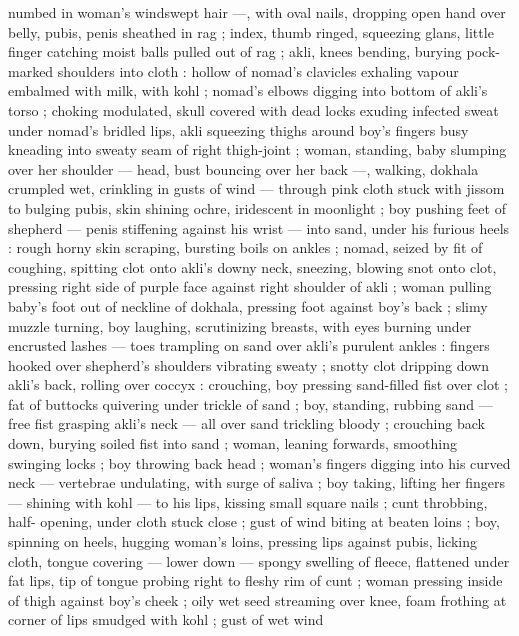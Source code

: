 {numbed in woman's windswept hair ---, with oval nails, dropping 
open hand over belly, pubis, penis sheathed in rag ; index, thumb 
ringed, squeezing glans, little finger catching moist balls pulled out 
of rag ; akli, knees bending, burying pock-marked shoulders into 
cloth : hollow of nomad's clavicles exhaling vapour embalmed with 
milk, with kohl ; nomad's elbows digging into bottom of akli's torso 
; choking modulated, skull covered with dead locks exuding infected 
sweat under nomad's bridled lips, akli squeezing thighs around boy's 
fingers busy kneading into sweaty seam of right thigh-joint ; woman, 
standing, baby slumping over her shoulder --- head, bust bouncing 
over her back ---, walking, dokhala crumpled wet, crinkling in gusts 
of wind --- through pink cloth stuck with jissom to bulging pubis, skin 
shining ochre, iridescent in moonlight ; boy pushing feet of shepherd 
--- penis stiffening against his wrist --- into sand, under his furious 
heels : rough horny skin scraping, bursting boils on ankles ; nomad, 
seized by fit of coughing, spitting clot onto akli's downy neck, 
sneezing, blowing snot onto clot, pressing right side of purple face 
against right shoulder of akli ; woman pulling baby's foot out of 
neckline of dokhala, pressing foot against boy's back ; slimy muzzle 
turning, boy laughing, scrutinizing breasts, with eyes burning under 
encrusted lashes --- toes trampling on sand over akli's purulent 
ankles : fingers hooked over shepherd's shoulders vibrating sweaty 
; snotty clot dripping down akli's back, rolling over coccyx : 
crouching, boy pressing sand-filled fist over clot ; fat of buttocks 
quivering under trickle of sand ; boy, standing, rubbing sand --- free 
fist grasping akli's neck --- all over sand trickling bloody ; crouching 
back down, burying soiled fist into sand ; woman, leaning forwards, 
smoothing swinging locks ; boy throwing back head ; woman's 
fingers digging into his curved neck --- vertebrae undulating, with 
surge of saliva ; boy taking, lifting her fingers --- shining with kohl 
--- to his lips, kissing small square nails ; cunt throbbing, half- 
opening, under cloth stuck close ; gust of wind biting at beaten loins 
; boy, spinning on heels, hugging woman's loins, pressing lips 
against pubis, licking cloth, tongue covering --- lower down --- 
spongy swelling of fleece, flattened under fat lips, tip of tongue 
probing right to fleshy rim of cunt ; woman pressing inside of thigh 
against boy's cheek ; oily wet seed streaming over knee, foam 
frothing at corner of lips smudged with kohl ; gust of wet wind 
}
